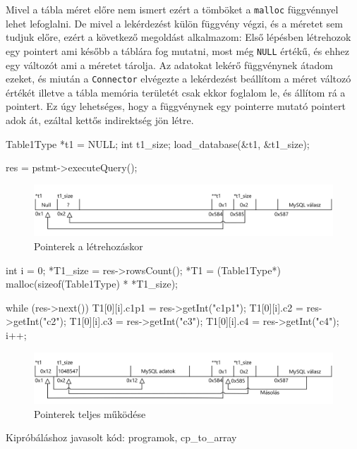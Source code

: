 Mivel a tábla méret előre nem ismert ezért a tömböket a \texttt{malloc} függvénnyel lehet lefoglalni. De mivel a lekérdezést külön függvény végzi, és a méretet sem tudjuk előre, ezért a következő megoldást alkalmazom:
Első lépésben létrehozok egy pointert ami később a táblára fog mutatni, most még \texttt{NULL} értékű, és ehhez egy változót ami a méretet tárolja. Az adatokat lekérő függvénynek átadom ezeket, és miután a \texttt{Connector} elvégezte a lekérdezést beállítom a méret változó értékét illetve a tábla memória területét csak ekkor foglalom le, és állítom rá a pointert. Ez úgy lehetséges, hogy a függvénynek egy pointerre mutató pointert adok át, ezáltal kettős indirektség jön létre.

\begin{cpp}
Table1Type *t1 = NULL;
int t1_size;
load_database(&t1, &t1_size);
	
res = pstmt->executeQuery();
\end{cpp}
\begin{figure}[h!]
\centering
\includegraphics[width=\textwidth]{images/implementation/pointer_01.png}
\caption{Pointerek a létrehozáskor}
\label{fig:opencl}
\end{figure}
\begin{cpp}
int i = 0;
*T1_size = res->rowsCount();
*T1 = (Table1Type*) malloc(sizeof(Table1Type) * *T1_size);

while (res->next()) {
  T1[0][i].c1p1 = res->getInt("c1p1"); T1[0][i].c2 = res->getInt("c2");
  T1[0][i].c3 = res->getInt("c3"); T1[0][i].c4 = res->getInt("c4");
  i++;
}
\end{cpp}
\begin{figure}[h!]
\centering
\includegraphics[width=\textwidth]{images/implementation/pointer_02.png}
\caption{Pointerek teljes működése}
\label{fig:opencl}
\end{figure}
Kipróbáláshoz javasolt kód: programok, cp\_to\_array

